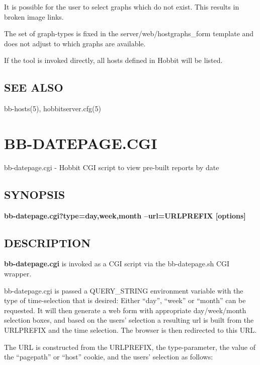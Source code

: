   It is possible for the user to select graphs which do not exist. This results in broken image links. 


  The set of graph-types is fixed in the server/web/hostgraphs\_form template and does not adjust to which graphs are available. 


  If the tool is invoked directly, all hosts defined in Hobbit will be listed. 


 
\subsection{SEE ALSO}
bb-hosts(5), hobbitserver.cfg(5) 

 

%
%

\newpage
\section{BB-DATEPAGE.CGI}

 bb-datepage.cgi - Hobbit CGI script to view pre-built reports by date \

\subsection{SYNOPSIS}

\textbf{bb-datepage.cgi?type={day,week,month} --url=URLPREFIX [options]}


 
\subsection{DESCRIPTION}
\textbf{bb-datepage.cgi}
 is invoked as a CGI script via the bb-datepage.sh CGI wrapper. 

  bb-datepage.cgi is passed a QUERY\_STRING environment variable with
  the type of time-selection that is desired: Either ``day'', ``week''
  or ``month'' can be requested. It will then generate a web form with
  appropriate day/week/month selection boxes, and based on the users'
  selection a resulting url is built from the URLPREFIX and the time
  selection. The browser is then redirected to this URL. 



  The URL is constructed from the URLPREFIX, the type-parameter, the
  value of the ``pagepath'' or ``host'' cookie, and the users'
  selection as follows: 



